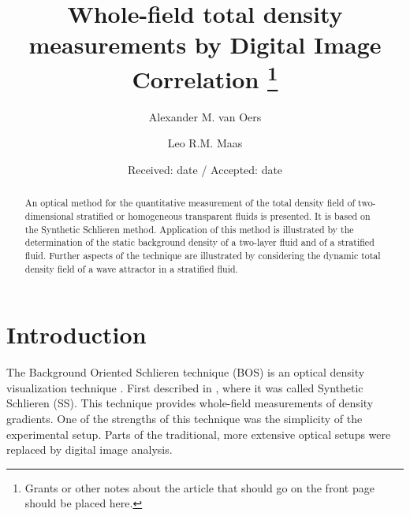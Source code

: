 \documentclass{svjour3}                     %
\begin{document}
\title{Whole-field total density measurements by Digital Image Correlation
\thanks{Grants or other notes
about the article that should go on the front page should be
placed here. }
}




\author{Alexander M. van Oers \and
       Leo R.M. Maas %
}



\date{Received: date / Accepted: date}


\maketitle

\begin{abstract}
An optical method for the quantitative measurement of the total density field of two-dimensional stratified or homogeneous transparent fluids is presented. It is based on the Synthetic Schlieren method. Application of this method is illustrated by the determination of the static background density of a two-layer fluid and of a stratified fluid. Further aspects of the technique are illustrated by considering the dynamic total density field of a wave attractor in a stratified fluid.
\end{abstract}

\section{Introduction}
\label{intro}
The Background Oriented Schlieren technique (BOS) is an optical density visualization technique \cite{meier2002computerized,raffel2015background}. First described in \cite{dalziel2000whole}, where it was called Synthetic Schlieren (SS). This technique provides whole-field measurements of density gradients. One of the strengths of this technique was the simplicity of the experimental setup. Parts of the traditional, more extensive optical setups were replaced by digital image analysis. 
\end{document}
